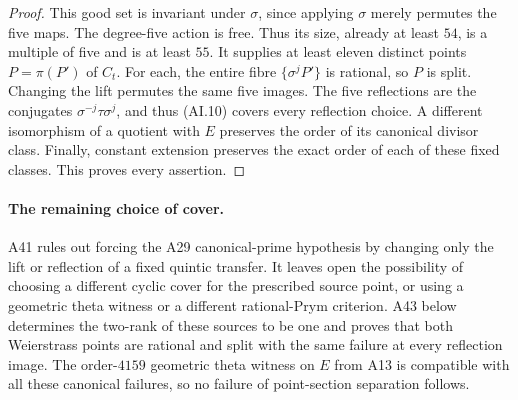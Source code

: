 \begin{proof}
This good set is invariant under $\sigma$, since applying
$\sigma$ merely permutes the five maps. The degree-five
action is free. Thus its size, already at least $54$, is
a multiple of five and is at least $55$. It supplies at
least eleven distinct points $P=\pi(P')$ of $C_t$.
For each, the entire fibre $\{\sigma^jP'\}$ is rational,
so $P$ is split. Changing the lift permutes the same five
images. The five reflections are the conjugates
$\sigma^{-j}\tau\sigma^j$, and thus (AI.10) covers every
reflection choice. A different isomorphism of a quotient
with $E$ preserves the order of its canonical divisor
class. Finally, constant extension preserves the exact
order of each of these fixed classes. This proves every
assertion.
\end{proof}

\paragraph{The remaining choice of cover.}
A41 rules out forcing the A29 canonical-prime hypothesis
by changing only the lift or reflection of a fixed
quintic transfer. It leaves open the possibility of
choosing a different cyclic cover for the prescribed
source point, or using a geometric theta witness or a
different rational-Prym criterion. A43 below determines the
two-rank of these sources to be one and proves that both
Weierstrass points are rational and split with the same failure
at every reflection image. The order-$4159$
geometric theta witness on $E$ from A13 is compatible
with all these canonical failures, so no failure of
point-section separation follows.
